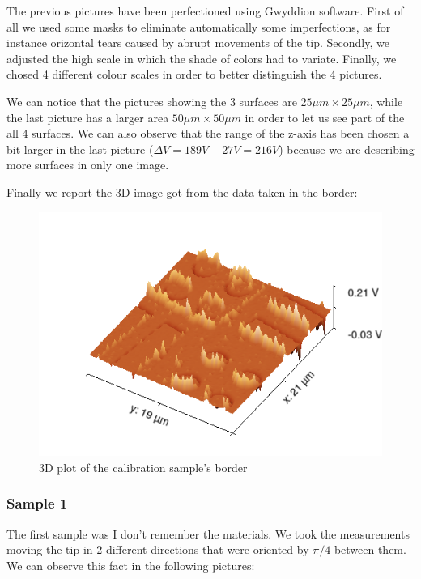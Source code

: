 \documentclass[11pt,a4paper]{article}
\begin{document}
The previous pictures have been perfectioned using Gwyddion software. First of all we used some masks to eliminate automatically some imperfections, as for instance orizontal tears caused by abrupt movements of the tip. Secondly, we adjusted the high scale in which the shade of colors had to variate. Finally, we chosed 4 different colour scales in order to better distinguish the 4 pictures.

We can notice that the pictures showing the 3 surfaces are $25\mu m \times 25 \mu m$, while the last picture has a larger area $50\mu m \times 50 \mu m$ in order to let us see part of the all 4 surfaces. We can also observe that the range of the z-axis has been chosen a bit larger in the last picture ($\Delta V=189V+27V=216V$) because we are describing more surfaces in only one image.

Finally we report the 3D image got from the data taken in the border:

\begin{figure}[ht]
\centering
\includegraphics[scale=0.47]{sm_border_3D}
\caption{3D plot of the calibration sample's border}
\label{fig: cal sam border}
\end{figure}

\subsubsection{Sample 1}
The first sample was {\color{Red} I don't remember the materials}. We took the measurements moving the tip in 2 different directions that were oriented by $\pi /4$ between them. We can observe this fact in the following pictures:
\end{document}
